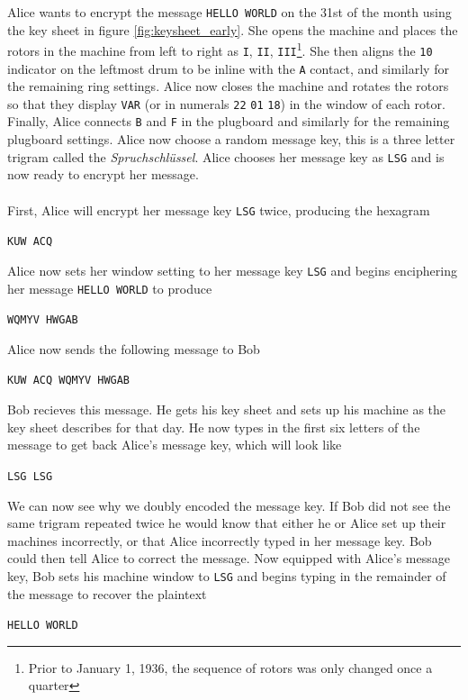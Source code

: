 \noindent Alice wants to encrypt the message \texttt{HELLO WORLD} on
the 31st of the month using the key sheet in figure
\ref{fig:keysheet_early}. She opens the machine and places the rotors in
the machine from left to right as \texttt{I}, \texttt{II},
\texttt{III}\footnote{Prior to January 1, 1936, the sequence of
rotors was only changed once a quarter}. She then aligns the
\texttt{10} indicator on the
leftmost drum to be inline with the \texttt{A} contact, and similarly
for the remaining ring settings. Alice now closes the machine and
rotates the rotors so that they display \texttt{VAR} (or in numerals \texttt{22} \texttt{01} \texttt{18}) in the window of
each rotor. Finally, Alice connects \texttt{B} and \texttt{F} in the
plugboard and similarly for the remaining plugboard settings. Alice
now choose a random message key, this is a three letter trigram
called the \emph{Spruchschlüssel}. Alice chooses her message key as
\texttt{LSG} and is now ready to encrypt her message.
\\\\First, Alice will encrypt her message key \texttt{LSG} twice,
producing the hexagram
\begin{center}
  \texttt{KUW ACQ}
\end{center}
\noindent Alice now sets her window setting to her message key
\texttt{LSG} and begins enciphering her message \texttt{HELLO WORLD} to produce
\begin{center}
  \texttt{WQMYV HWGAB}
\end{center}
Alice now sends the following message to Bob
\begin{center}
  \texttt{KUW ACQ WQMYV HWGAB}
\end{center}
\noindent Bob recieves this message. He gets his key sheet and sets
up his machine as the key sheet describes for that day. He now types
in the first six letters of the message to get back Alice's message
key, which will look like
\begin{center}
  \texttt{LSG LSG}
\end{center}
We can now see why we doubly encoded the message key. If Bob did not
see the same trigram repeated twice he would know that either he or
Alice set up their machines incorrectly, or that Alice incorrectly typed in
her message key. Bob could then tell Alice to correct the message.
Now equipped with Alice's message key, Bob sets his machine window to
\texttt{LSG} and begins typing in the remainder of the message to
recover the plaintext
\begin{center}
  \texttt{HELLO WORLD}
\end{center}
